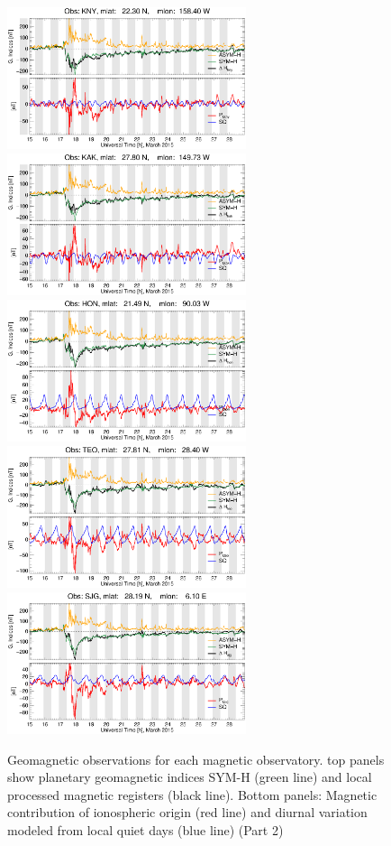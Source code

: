 \documentclass[a4paper]{article}
\theoremstyle{plain}
\theoremstyle{definition}
\begin{document}
\begin{figure}
	\ContinuedFloat %
	\centering
	
	\includegraphics[width=7.0cm]{fig/magdata/kny_2015-03-15_2015-03-28.eps}  
	\includegraphics[width=7.0cm]{fig/magdata/kak_2015-03-15_2015-03-28.eps}
	\includegraphics[width=7.0cm]{fig/magdata/hon_2015-03-15_2015-03-28.eps}
	\includegraphics[width=7.0cm]{fig/magdata/teo_2015-03-15_2015-03-28.eps}
	\includegraphics[width=7.0cm]{fig/magdata/sjg_2015-03-15_2015-03-28.eps}
	\caption{Geomagnetic observations for each magnetic observatory. top panels show planetary geomagnetic indices SYM-H (green line) and local processed magnetic registers (black line). Bottom panels: Magnetic contribution of ionospheric origin (red line) and diurnal variation modeled from local quiet days (blue line) (Part 2)}
\end{figure}
\end{document}
